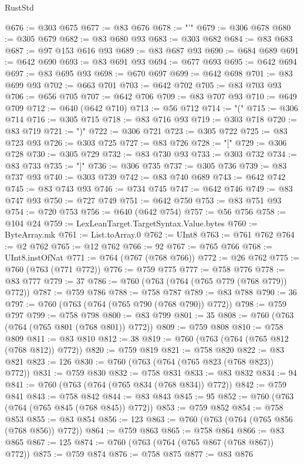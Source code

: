 \begin{lexlean}{RustStd}
\begin{coremodule}
@676 := @303 @675
@677 := @83 @676
@678 := "'"
@679 := @306 @678
@680 := @305 @679
@682 := @83 @680 @93
@683 := @303 @682
@684 := @83 @683
@687 := @97 @153 @616 @93
@689 := @83 @687 @93
@690 := @684 @689
@691 := @642 @690
@693 := @83 @691 @93
@694 := @677 @693
@695 := @642 @694
@697 := @83 @695 @93
@698 := @670 @697
@699 := @642 @698
@701 := @83 @699 @93
@702 := @663 @701
@703 := @642 @702
@705 := @83 @703 @93
@706 := @656 @705
@707 := @642 @706
@709 := @83 @707 @93
@710 := @649 @709
@712 := @640 (@642 @710)
@713 := @56 @712
@714 := "("
@715 := @306 @714
@716 := @305 @715
@718 := @83 @716 @93
@719 := @303 @718
@720 := @83 @719
@721 := ")"
@722 := @306 @721
@723 := @305 @722
@725 := @83 @723 @93
@726 := @303 @725
@727 := @83 @726
@728 := "["
@729 := @306 @728
@730 := @305 @729
@732 := @83 @730 @93
@733 := @303 @732
@734 := @83 @733
@735 := "]"
@736 := @306 @735
@737 := @305 @736
@739 := @83 @737 @93
@740 := @303 @739
@742 := @83 @740 @689
@743 := @642 @742
@745 := @83 @743 @93
@746 := @734 @745
@747 := @642 @746
@749 := @83 @747 @93
@750 := @727 @749
@751 := @642 @750
@753 := @83 @751 @93
@754 := @720 @753
@756 := @640 (@642 @754)
@757 := @56 @756
@758 := @104 @24
@759 := LexLeanTarget.TargetSyntax.Value.bytes
@760 := ByteArray.mk
@761 := List.toArray.{0}
@762 := UInt8
@763 := @761 @762
@764 := @2 @762
@765 := @12 @762
@766 := 92
@767 := @765 @766
@768 := UInt8.instOfNat
@771 := @764 (@767 (@768 @766))
@772 := @26 @762
@775 := @760 (@763 (@771 @772))
@776 := @759 @775
@777 := @758 @776
@778 := @83 @777
@779 := 37
@786 := @760 (@763 (@764 (@765 @779 (@768 @779)) @772))
@787 := @759 @786
@788 := @758 @787
@789 := @83 @788
@790 := 36
@797 := @760 (@763 (@764 (@765 @790 (@768 @790)) @772))
@798 := @759 @797
@799 := @758 @798
@800 := @83 @799
@801 := 35
@808 := @760 (@763 (@764 (@765 @801 (@768 @801)) @772))
@809 := @759 @808
@810 := @758 @809
@811 := @83 @810
@812 := 38
@819 := @760 (@763 (@764 (@765 @812 (@768 @812)) @772))
@820 := @759 @819
@821 := @758 @820
@822 := @83 @821
@823 := 126
@830 := @760 (@763 (@764 (@765 @823 (@768 @823)) @772))
@831 := @759 @830
@832 := @758 @831
@833 := @83 @832
@834 := 94
@841 := @760 (@763 (@764 (@765 @834 (@768 @834)) @772))
@842 := @759 @841
@843 := @758 @842
@844 := @83 @843
@845 := 95
@852 := @760 (@763 (@764 (@765 @845 (@768 @845)) @772))
@853 := @759 @852
@854 := @758 @853
@855 := @83 @854
@856 := 123
@863 := @760 (@763 (@764 (@765 @856 (@768 @856)) @772))
@864 := @759 @863
@865 := @758 @864
@866 := @83 @865
@867 := 125
@874 := @760 (@763 (@764 (@765 @867 (@768 @867)) @772))
@875 := @759 @874
@876 := @758 @875
@877 := @83 @876

\end{coremodule}
\end{lexlean}
